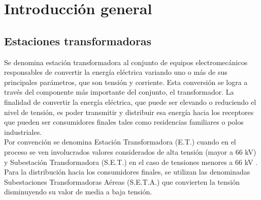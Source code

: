 \chapter{Introducción general} %

\label{Chapter1} %
\label{IntroGeneral}


\newcommand{\keyword}[1]{\textbf{#1}}
\newcommand{\tabhead}[1]{\textbf{#1}}
\newcommand{\code}[1]{\texttt{#1}}
\newcommand{\file}[1]{\texttt{\bfseries#1}}
\newcommand{\option}[1]{\texttt{\itshape#1}}
\newcommand{\grados}{$^{\circ}$}



\section{Estaciones transformadoras}

Se denomina estación transformadora al conjunto de equipos electromecánicos responsables de convertir la energía eléctrica variando uno o más de sus principales parámetros, que son tensión y corriente. Esta conversión se logra a través del componente más importante del conjunto, el transformador. La finalidad de convertir la energía eléctrica, que puede ser elevando o reduciendo el nivel de tensión, es poder transmitir y distribuir esa energía hacia los receptores que pueden ser consumidores finales tales como residencias familiares o polos industriales.\\

Por convención se denomina Estación Transformadora (E.T.) cuando en el proceso se ven involucrados valores considerados de alta tensión (mayor a 66 kV) y Subestación Transformadora (S.E.T.) en el caso de tensiones menores a 66 kV \citep{AEA:1}.\\
Para la distribución hacia los consumidores finales, se utilizan las denominadas Subestaciones Transformadoras Aéreas (S.E.T.A.) que convierten la tensión disminuyendo su valor de media a baja tensión.\\

